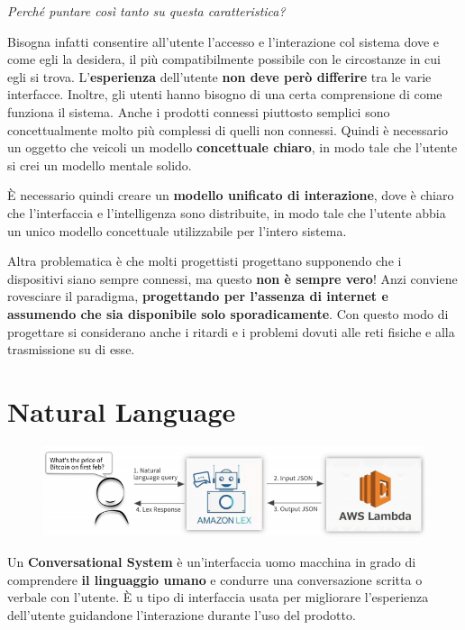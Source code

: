 \documentclass[a4paper,11pt,oneside]{book}
\begin{document}
\begin{flushleft}
	\textit{Perché puntare così tanto su
		questa caratteristica?}
\end{flushleft}

Bisogna infatti consentire all'utente l'accesso e l'interazione col sistema dove e come egli la desidera, il più compatibilmente possibile con le circostanze in cui egli si trova. L'\textbf{esperienza} dell'utente \textbf{non deve però differire} tra le varie interfacce. Inoltre, gli utenti hanno bisogno di una certa comprensione di come funziona il sistema. Anche i prodotti connessi piuttosto semplici sono concettualmente molto più complessi di quelli non connessi. Quindi è necessario un oggetto che veicoli un modello \textbf{concettuale chiaro}, in modo tale che l'utente si crei un modello mentale solido.

È necessario quindi creare un
\textbf{modello unificato di interazione}, dove è chiaro che l'interfaccia e l'intelligenza sono distribuite, in modo tale che l'utente abbia un unico modello concettuale utilizzabile per l'intero sistema.

Altra problematica è che molti progettisti progettano supponendo che i dispositivi siano sempre connessi, ma questo \textbf{non è sempre vero}! Anzi conviene rovesciare il paradigma, \textbf{progettando per l'assenza di internet e assumendo che sia disponibile solo sporadicamente}. Con questo modo di progettare si considerano anche i ritardi e i problemi dovuti alle reti fisiche e alla trasmissione su di esse.

\chapter{Natural Language}

\begin{figure}[!h]
	\includegraphics[scale=0.5]{immagini/Natural_language.png}
\end{figure}

Un \textbf{Conversational System} è un'interfaccia uomo macchina in grado di comprendere \textbf{il linguaggio umano} e condurre una conversazione scritta o verbale con l'utente. È u tipo di interfaccia usata per migliorare l'esperienza dell'utente guidandone l'interazione durante l'uso del prodotto.
\end{document}
